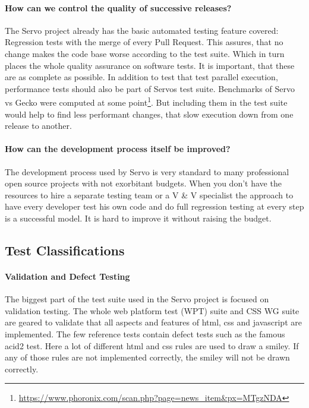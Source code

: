\documentclass{scrartcl}
\begin{document}
\paragraph{How can we control the quality of successive releases?}
The Servo project already has the basic automated testing feature covered: Regression tests with the merge of every Pull Request. This assures, that no change makes the code base worse according to the test suite. Which in turn places the whole quality assurance on software tests. It is important, that these are as complete as possible. In addition to test that test parallel execution, performance tests should also be part of Servos test suite. Benchmarks of Servo vs Gecko were computed at some point\footnote{\url{https://www.phoronix.com/scan.php?page=news_item&px=MTgzNDA}}. But including them in the test suite would help to find less performant changes, that slow execution down from one release to another.

\paragraph{How can the development process itself be improved?}
The development process used by Servo is very standard to many professional open source projects with not exorbitant budgets. When you don't have the resources to hire a separate testing team or a V \& V specialist the approach to have every developer test his own code and do full regression testing at every step is a successful model. It is hard to improve it without raising the budget. 


\subsection{Test Classifications}

\paragraph{Validation and Defect Testing}
The biggest part of the test suite used in the Servo project is focused on validation testing. The whole web platform test (WPT) suite and CSS WG suite are geared to validate that all aspects and features of html, css and javascript are implemented. The few reference tests contain defect tests such as the famous acid2 test. Here a lot of different html and css rules are used to draw a smiley. If any of those rules are not implemented correctly, the smiley will not be drawn correctly.
\end{document}
